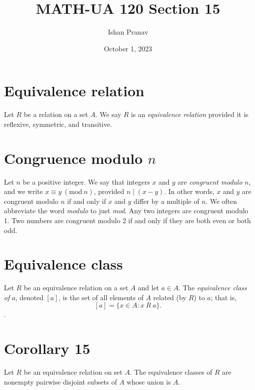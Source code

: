 \documentclass[12pt]{article}
\title{MATH-UA 120 Section 15}
\author{Ishan Pranav}
\date{October 1, 2023}
\begin{document}
\maketitle
\section*{Equivalence relation}
Let $R$ be a relation on a set $A$. We say $R$ is an \textit{equivalence relation} provided it is reflexive, symmetric, and transitive.
\section*{Congruence modulo $n$}
Let $n$ be a positive integer. We say that integers $x$ and $y$ are \textit{congruent modulo} $n$, and we write $x\equiv y~(\mathrm{mod}~n)$, provided $n\mid (x-y)$. In other words, $x$ and $y$ are congruent modulo $n$ if and only if $x$ and $y$ differ by a multiple of $n$. We often abbreviate the word \textit{modulo} to just \textit{mod}. Any two integers are congruent modulo 1. Two numbers are congruent modulo 2 if and only if they are both even or both odd.
\section*{Equivalence class}
Let $R$ be an equivalence relation on a set $A$ and let $a\in A$. The \textit{equivalence class of} $a$, denoted $[a]$, is the set of all elements of $A$ related (by $R$) to $a$; that is,
\[[a]=\{x\in A:x~R~a\}.\].
\section*{Corollary 15}
Let $R$ be an equivalence relation on set $A$. The equivalence classes of $R$ are nonempty pairwise disjoint subsets of $A$ whose union is $A$.
\end{document}
